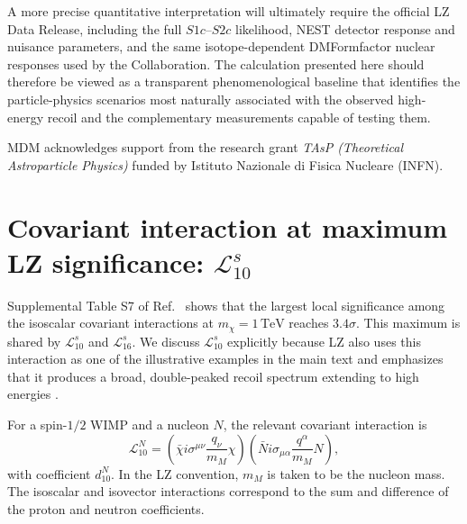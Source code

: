 \documentclass[aps,prd,reprint,superscriptaddress,nofootinbib,longbibliography,floatfix]{revtex4-2}
\newcommand{\TeV}{\mathrm{TeV}}
\begin{document}
A more precise quantitative interpretation will ultimately require the official LZ Data Release, including the full $S1c$--$S2c$ likelihood, NEST detector response and nuisance parameters, and the same isotope-dependent DMFormfactor nuclear responses used by the Collaboration. The calculation presented here should therefore be viewed as a transparent phenomenological baseline that identifies the particle-physics scenarios most naturally associated with the observed high-energy recoil and the complementary measurements capable of testing them.

\begin{acknowledgments}
MDM acknowledges support from the research grant {\sl TAsP (Theoretical Astroparticle Physics)} funded by Istituto Nazionale di Fisica Nucleare (INFN).
\end{acknowledgments}

\newpage



\appendix

\section{\texorpdfstring{Covariant interaction at maximum LZ significance: $\mathcal{L}_{10}^{s}$}{Covariant interaction at maximum LZ significance: L10s}}
\label{app:l10}

Supplemental Table S7 of Ref.~\cite{LZ2026Extended} shows that the largest local significance among the isoscalar covariant interactions at $m_\chi=1\,\TeV$ reaches $3.4\sigma$. This maximum is shared by $\mathcal{L}_{10}^{s}$ and $\mathcal{L}_{16}^{s}$. We discuss $\mathcal{L}_{10}^{s}$ explicitly because LZ also uses this interaction as one of the illustrative examples in the main text and emphasizes that it produces a broad, double-peaked recoil spectrum extending to high energies \cite{LZ2024NREFT,LZ2026Extended}.

For a spin-$1/2$ WIMP and a nucleon $N$, the relevant covariant interaction is
\begin{equation}
\mathcal{L}_{10}^{N}
=
\left(
\bar\chi i\sigma^{\mu\nu}
\frac{q_\nu}{m_M}
\chi
\right)
\left(
\bar N i\sigma_{\mu\alpha}
\frac{q^\alpha}{m_M}
N
\right),
\label{eq:L10covariant}
\end{equation}
with coefficient $d_{10}^{N}$. In the LZ convention, $m_M$ is taken to be the nucleon mass. The isoscalar and isovector interactions correspond to the sum and difference of the proton and neutron coefficients.
\end{document}
